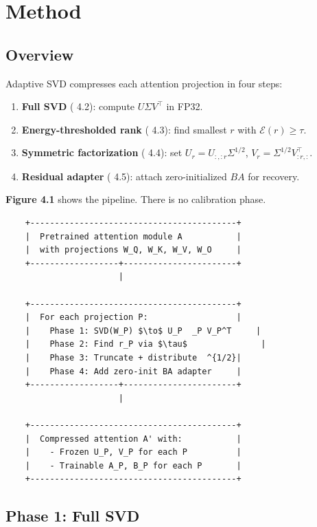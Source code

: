 
\section{Method}

\subsection{Overview}

Adaptive SVD compresses each attention projection in four steps:

\begin{enumerate}
\item \textbf{Full SVD} ( 4.2): compute $U \Sigma V^\top$ in FP32.
\item \textbf{Energy-thresholded rank} ( 4.3): find smallest $r$ with $\mathcal{E}(r) \geq \tau$.
\item \textbf{Symmetric factorization} ( 4.4): set $U_r = U_{:, :r} \Sigma^{1/2}$,
  $V_r = \Sigma^{1/2} V_{:r, :}^\top$.
\item \textbf{Residual adapter} ( 4.5): attach zero-initialized $B A$ for recovery.

\end{enumerate}
\textbf{Figure 4.1} shows the pipeline. There is no calibration phase.

\begin{lstlisting}
    +------------------------------------------+
    |  Pretrained attention module A           |
    |  with projections W_Q, W_K, W_V, W_O     |
    +------------------+-----------------------+
                       |
                        
    +------------------------------------------+
    |  For each projection P:                  |
    |    Phase 1: SVD(W_P) $\to$ U_P  _P V_P^T     |
    |    Phase 2: Find r_P via $\tau$               |
    |    Phase 3: Truncate + distribute  ^{1/2}|
    |    Phase 4: Add zero-init BA adapter     |
    +------------------+-----------------------+
                       |
                        
    +------------------------------------------+
    |  Compressed attention A' with:           |
    |    - Frozen U_P, V_P for each P          |
    |    - Trainable A_P, B_P for each P       |
    +------------------------------------------+
\end{lstlisting}

\subsection{Phase 1: Full SVD}

